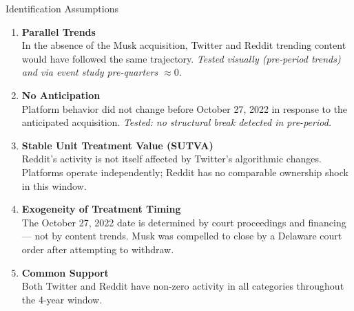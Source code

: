 \documentclass[aspectratio=169]{beamer}
\begin{document}
\begin{frame}{Identification Assumptions}

\begin{enumerate}
    \setlength\itemsep{0.6em}

    \item \textbf{Parallel Trends}\\
    In the absence of the Musk acquisition, Twitter and Reddit trending content would have followed the same trajectory. \textit{Tested visually (pre-period trends) and via event study pre-quarters $\approx 0$.}

    \item \textbf{No Anticipation}\\
    Platform behavior did not change before October 27, 2022 in response to the anticipated acquisition. \textit{Tested: no structural break detected in pre-period.}

    \item \textbf{Stable Unit Treatment Value (SUTVA)}\\
    Reddit's activity is not itself affected by Twitter's algorithmic changes. Platforms operate independently; Reddit has no comparable ownership shock in this window.

    \item \textbf{Exogeneity of Treatment Timing}\\
    The October 27, 2022 date is determined by court proceedings and financing --- not by content trends. Musk was compelled to close by a Delaware court order after attempting to withdraw.

    \item \textbf{Common Support}\\
    Both Twitter and Reddit have non-zero activity in all categories throughout the 4-year window.

\end{enumerate}
\end{frame}
\end{document}
